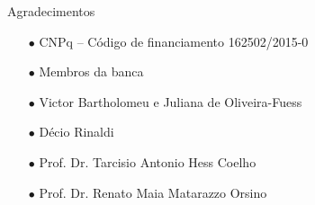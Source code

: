 \documentclass[25pt,landscape]{beamer}
\begin{document}
\begin{frame}{Agradecimentos}
    \begin{block}{}
        \begin{itemize}
            \item[$\bullet$] CNPq -- Código de financiamento 162502/2015-0 \\[8pt]
            \item[$\bullet$] Membros da banca \\[8pt]
            
            \item[$\bullet$] Victor Bartholomeu e Juliana de Oliveira-Fuess \\[8pt]
            \item[$\bullet$] Décio Rinaldi \\[8pt]
            \item[$\bullet$] Prof. Dr. Tarcisio Antonio Hess Coelho \\[8pt]
            \item[$\bullet$] Prof. Dr. Renato Maia Matarazzo Orsino \\[8pt]
        \end{itemize}
    \end{block}
\end{frame}












\end{document}
